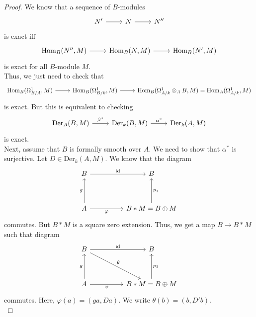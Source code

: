 \documentclass[oneside, 12pt]{scrbook}
\theoremstyle{theorem}
\begin{document}
\begin{proof}
We know that a sequence of $B$-modules \[\begin{tikzcd}
	{N'} & N & {N''}
	\arrow[from=1-1, to=1-2]
	\arrow[from=1-2, to=1-3]
\end{tikzcd}\] is exact iff \[\begin{tikzcd}
	{\mathrm{Hom}_{B}(N'',M)} & {\mathrm{Hom}_{B}(N,M)} & {\mathrm{Hom}_{B}(N',M)}
	\arrow[from=1-1, to=1-2]
	\arrow[from=1-2, to=1-3]
\end{tikzcd}\] is exact for all $B$-module $M$. \\

Thus, we just need to check that \[\begin{tikzcd}
	{\mathrm{Hom}_{B}(\Omega_{B/A}^{1},M)} & {\mathrm{Hom}_{B}(\Omega_{B/k}^{1},M)} & {\mathrm{Hom}_{B}(\Omega_{A/k}^{1} \otimes_{A} B,M)} = {\mathrm{Hom}_{A}(\Omega_{A/k}^{1},M)}
	\arrow[from=1-1, to=1-2]
	\arrow[from=1-2, to=1-3]
\end{tikzcd}\] is exact. But this is equivalent to checking \[\begin{tikzcd}
	{\mathrm{Der}_{A}(B,M)} & {\mathrm{Der}_{k}(B,M)} & {\mathrm{Der}_{k}(A,M)}
	\arrow["{\beta^*}", from=1-1, to=1-2]
	\arrow["{\alpha^*}", from=1-2, to=1-3]
\end{tikzcd}\] is exact. \\

Next, assume that $B$ is formally smooth over $A$. We need to show that $\alpha^*$ is surjective. Let $D\in \mathrm{Der}_{k}(A,M)$. We know that the diagram \[\begin{tikzcd}
	B && B \\
	\\
	A && {B*M = B \oplus M}
	\arrow["{\mathrm{id}}", from=1-1, to=1-3]
	\arrow["{p_{1}}"', from=3-3, to=1-3]
	\arrow["g", from=3-1, to=1-1]
	\arrow["\varphi"', from=3-1, to=3-3]
\end{tikzcd}\] commutes. But $B * M$ is a square zero extension. Thus, we get a map $B \rightarrow B *M$ such that diagram \[\begin{tikzcd}
	B && B \\
	\\
	A && {B*M = B \oplus M}
	\arrow["{\mathrm{id}}", from=1-1, to=1-3]
	\arrow["{p_{1}}"', from=3-3, to=1-3]
	\arrow["g", from=3-1, to=1-1]
	\arrow["\varphi"', from=3-1, to=3-3]
	\arrow["\theta", from=1-1, to=3-3]
\end{tikzcd}\]
commutes. Here, $\varphi(a) = (ga, Da)$. We write $\theta (b) = (b, D'b)$. \\


\end{proof}
\end{document}
